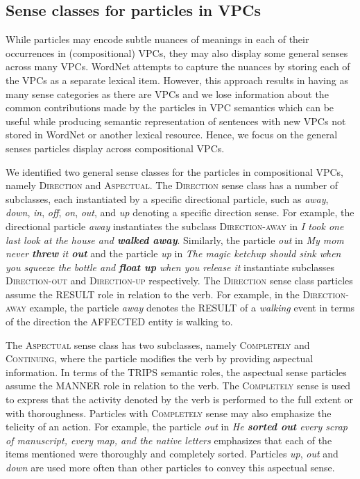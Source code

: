\documentclass[output=paper
,modfonts
,nonflat]{langsci/langscibook}
\begin{document}
\subsection{Sense classes for particles in VPCs} \label{sec:senses}

While particles may encode subtle nuances of meanings in each of their occurrences in (compositional) VPCs, they may also display some general senses across many VPCs. WordNet attempts to capture the nuances by storing each of the VPCs as a separate lexical item. However, this approach results in having as many sense categories as there are VPCs and we lose information about the common contributions made by the particles in VPC semantics which can be useful while producing semantic representation of sentences with new VPCs not stored in WordNet or another lexical resource. Hence, we focus on the general senses particles display across compositional VPCs. 

We identified two general sense classes for the particles in compositional VPCs, namely \textsc{Direction} and \textsc{Aspectual}. The \textsc{Direction} sense class has a number of subclasses, each instantiated by a specific directional particle, such as \textit{away}, \textit{down}, \textit{in}, \textit{off}, \textit{on}, \textit{out}, and \textit{up} denoting a specific direction sense. For example, the directional particle \textit{away} instantiates the subclass \textsc{Direction-away} in \textit{I took one last look at the house and \textbf{walked away}}. Similarly, the particle \textit{out} in \textit{My mom never \textbf{threw} it \textbf{out}} and the particle \textit{up} in \textit{The magic ketchup should sink when you squeeze the bottle and \textbf{float up} when you release it} instantiate subclasses \textsc{Direction-out} and \textsc{Direction-up} respectively. The \textsc{Direction} sense class particles assume the RESULT role in relation to the verb. For example, in the \textsc{Direction-away} example, the particle \textit{away} denotes the RESULT of a \textit{walking} event in terms of the direction the AFFECTED entity is walking to.

The \textsc{Aspectual} sense class has two subclasses, namely \textsc{Completely} and \textsc{Continuing}, where the particle modifies the verb by providing aspectual information. In terms of the TRIPS semantic roles, the aspectual sense particles assume the MANNER role in relation to the verb. The \textsc{Completely} sense is used to express that the activity denoted by the verb is performed to the full extent or with thoroughness. Particles with \textsc{Completely} sense may also emphasize the telicity of an action. For example, the particle \textit{out} in \textit{He \textbf{sorted out} every scrap of manuscript, every map, and the native letters} emphasizes that each of the items mentioned were thoroughly and completely sorted. Particles \textit{up}, \textit{out} and \textit{down} are used more often than other particles to convey this aspectual sense.
\end{document}
